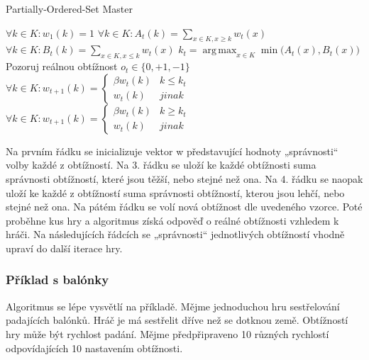 \begin{algorithm}
\caption{Partially-Ordered-Set Master}
\label{posm}
\begin{algorithmic}[1]
\State $\forall k \in K : w_1(k) = 1$
	 \State $\forall k \in K : A_t(k) = \sum_{x \in K, x \geq k} w_t(x)$
	 \State $\forall k \in K : B_t(k) = \sum_{x \in K, x \leq k} w_t(x)$
	 \State $k_t = \operatorname{arg\,max}_{x \in K} \min({A_t(x), B_t(x))}$
	 \State Pozoruj reálnou obtížnost $o_t\in \{0,+1,-1\}$
	   \State $\forall k \in K : w_{t+1}(k) = 
		                                        \begin{cases}
																						   \beta w_t(k) & k \leq k_t \\
																							 w_t(k) & jinak
																						\end{cases}
						 $
   \EndIf
	   \State $\forall k \in K : w_{t+1}(k) = 
		                                        \begin{cases}
																						   \beta w_t(k) & k \geq k_t \\
																							 w_t(k) & jinak
																						\end{cases}
						 $
   \EndIf
\EndFor
\end{algorithmic}
\end{algorithm}

Na prvním řádku se inicializuje vektor w představující hodnoty „správnosti“ volby každé z obtížností. Na 3. řádku se uloží ke každé obtížnosti suma správnosti obtížností, které jsou těžší, nebo stejné než ona. Na 4. řádku se naopak uloží ke každé z obtížností suma správnosti obtížností, kterou jsou lehčí, nebo stejné než ona. Na pátém řádku se volí nová obtížnost dle uvedeného vzorce. Poté proběhne kus hry a algoritmus získá odpověď o reálné obtížnosti vzhledem k hráči. Na následujících řádcích se „správnosti“ jednotlivých obtížností vhodně upraví do další iterace hry.

\subsubsection{Příklad s balónky}

Algoritmus se lépe vysvětlí na příkladě.\cite{23posm2} Mějme jednoduchou hru sestřelování padajících balónků. Hráč je má sestřelit dříve než se dotknou země. Obtížností hry může být rychlost padání. Mějme předpřipraveno 10 různých rychlostí odpovídajících 10 nastavením obtížnosti.

